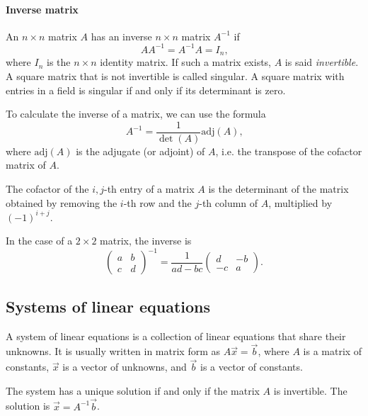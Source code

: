 \paragraph{Inverse matrix}  An $n \times n$ matrix $A$ has an inverse $n \times n$ matrix
$A^{-1}$ if
\[
  A A^{-1} = A^{-1} A = I_n\text{,}
\]
where $I_n$ is the $n \times n$ identity matrix.  If such a matrix exists, $A$ is said
\emph{invertible}.  A square matrix that is not invertible is called singular. A square
matrix with entries in a field is singular if and only if its determinant is zero.

To calculate the inverse of a matrix, we can use the formula
\[
  A^{-1} = \frac{1}{\det(A)} \text{adj}(A)\text{,}
\]
where $\text{adj}(A)$ is the adjugate (or adjoint) of $A$, i.e. the transpose of the cofactor matrix
of $A$.

The cofactor of the $i, j$-th entry of a matrix $A$ is the determinant of the matrix
obtained by removing the $i$-th row and the $j$-th column of $A$, multiplied by $(-1)^{i
+ j}$.

In the case of a $2 \times 2$ matrix, the inverse is
\[
  \begin{pmatrix}
    a & b \\
    c & d
  \end{pmatrix}^{-1} = \frac{1}{ad - bc}
  \begin{pmatrix}
    d & -b \\
    -c & a
  \end{pmatrix}\text{.}
\]

\subsection{Systems of linear equations}

A system of linear equations is a collection of linear equations that share their
unknowns.  It is usually written in matrix form as $A \vec{x} = \vec{b}$, where $A$ is a
matrix of constants, $\vec{x}$ is a vector of unknowns, and $\vec{b}$ is a vector of
constants.

The system has a unique solution if and only if the matrix $A$ is invertible.  The
solution is $\vec{x} = A^{-1} \vec{b}$.


